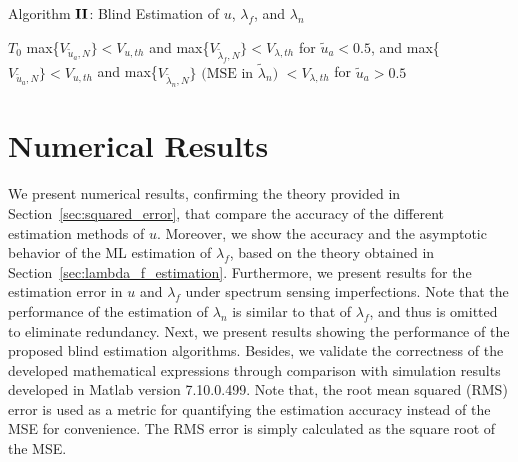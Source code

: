 \documentclass[11pt,draftclsnofoot,journal,onecolumn]{IEEEtran}
\begin{document}
\begin{algorithm}[t]
\centering
\caption{Algorithm $\bf{II}$: Blind Estimation of $u$, $\lambda_f$, and $\lambda_n$}
\label{alg:estimation_wesam_2}
\begin{algorithmic}[1]
\REQUIRE $T_0$
\ENSURE max\{$V_{\tilde{u}_a,N}\}<V_{u,th}$ and max\{$V_{\tilde{\lambda}_f,N}\}<V_{\lambda,th}$ for $\tilde{u}_a<0.5$, and max\{$V_{\tilde{u}_a,N}\}<V_{u,th}$ and max\{$V_{\tilde{\lambda}_n,N}\} \text{ (MSE in $\tilde{\lambda}_n$) } < V_{\lambda,th}$ for $\tilde{u}_a>0.5$
\ENDWHILE
{}
\ENDWHILE
\end{algorithmic}
\end{algorithm}

\section{Numerical Results}
\label{sec:numerical_results}

We present numerical results, confirming the theory provided in Section~\ref{sec:squared_error}, that compare the accuracy of the different estimation methods of $u$. Moreover, we show the accuracy and the asymptotic behavior of the ML estimation of $\lambda_f$, based on the theory obtained in Section~\ref{sec:lambda_f_estimation}. Furthermore, we present results for the estimation error in $u$ and $\lambda_f$ under spectrum sensing imperfections. Note that the performance of the estimation of $\lambda_n$ is similar to that of $\lambda_f$, and thus is omitted to eliminate redundancy. Next, we present results showing the performance of the proposed blind estimation algorithms. Besides, we validate the correctness of the developed mathematical expressions through comparison with simulation results developed in Matlab version 7.10.0.499. Note that, the root mean squared (RMS) error is used as a metric for quantifying the estimation accuracy instead of the MSE for convenience. The RMS error is simply calculated as the square root of the MSE. 
\end{document}
